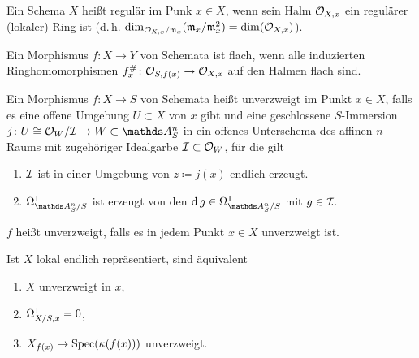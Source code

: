 \documentclass[german]{scrreprt}
\begin{document}
\begin{Definition}[Regulär]
Ein Schema $X$ heißt regulär im Punk $x\in X$, wenn sein Halm
$\mathcal{O}_{X,x}$ ein regulärer (lokaler) Ring ist
(d.\,h. $\dim_{\mathcal{O}_{X,x}/\mathfrak{m}_x}(\mathfrak{m}_x/\mathfrak{m}_x^2)=\dim(\mathcal{O}_{X,x})$).
\end{Definition}

\begin{Definition}
Ein Morphismus $f\colon X\to Y$ von Schemata ist flach, wenn alle
induzierten Ringhomomorphismen $f_x^\#\colon \mathcal{O}_{S,f(x)}\to\mathcal{O}_{X,x}$  auf
den Halmen flach sind.
\cite[]{bosch, goodreduction}
\end{Definition}

\begin{Definition}
  Ein Morphismus $f\colon X\to S$ von Schemata heißt unverzweigt im
  Punkt $x\in X$, falls es eine offene Umgebung
  $U\subset X$ von $x$ gibt und eine geschlossene $S$-Immersion
  $j\colon U\cong\O_W/\I\to W\subset\A_S^n$ in ein offenes Unterschema
  des affinen $n$-Raums mit zugehöriger Idealgarbe $\mathcal{I}\subset\mathcal{O}_W$,
  für die gilt
  \begin{enumerate}[label=(\alph*)]
  \item $\mathcal{I}$ ist in einer Umgebung von $z\coloneqq j(x)$ endlich erzeugt.
  \item $\Om{\A_S^n/S}$ ist erzeugt von den $\d g\in\Om{\A_S^n/S}$
    mit $g\in\mathcal{I}$.
  \end{enumerate}
  $f$ heißt unverzweigt, falls es in jedem Punkt $x\in X$
  unverzweigt ist.
  \begin{Bemerkung}
    Ist $X$ lokal endlich repräsentiert, sind äquivalent
    \begin{enumerate}[label=(\roman*)]
    \item $X$ unverzweigt in $x$,
    \item $\Omega_{X/S,x}^1=0$,
    \item $X_{f(x)}\to \operatorname{Spec}(\kappa(f(x)))$ unverzweigt.
    \end{enumerate}
    \cite[8.4, Theorem 3]{bosch}
  \end{Bemerkung}
\end{Definition}
\end{document}
